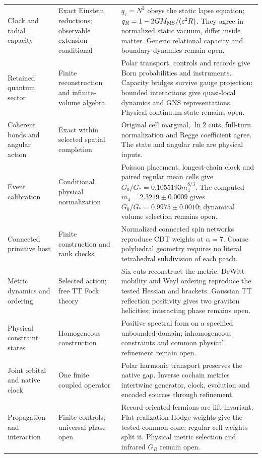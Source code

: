 \documentclass[11pt]{article}
\begin{document}
\begin{longtable}{L{0.24\textwidth}L{0.22\textwidth}L{0.47\textwidth}}
Clock and radial capacity & Exact Einstein reductions; observable extension conditional & $q_\tau=N^2$ obeys the static lapse equation; $q_R=1-2GM_{\rm MS}/(c^2R)$. They agree in normalized static vacuum, differ inside matter. Generic relational capacity and boundary dynamics remain open.\\
Retained quantum sector & Finite reconstruction and infinite-volume algebra & Polar transport, controls and records give Born probabilities and instruments. Capacity bridges survive gauge projection; bounded interactions give quasi-local dynamics and GNS representations. Physical continuum state remains open.\\
Coherent bonds and angular action & Exact within selected spatial completion & Original cell marginal, $\ln2$ cuts, full-turn normalization and Regge coefficient agree. The state and angular rule are physical inputs.\\
Event calibration & Conditional physical normalization & Poisson placement, longest-chain clock and paired regular mean cells give $G_0/G_*=0.1055193m_4^{8/3}$. The computed $m_4=2.3219\pm0.0009$ gives $G_0/G_*=0.9975\pm0.0010$; dynamical volume selection remains open.\\
Connected primitive host & Finite construction and rank checks & Normalized connected spin networks reproduce CDT weights at $\alpha=7$. Coarse polyhedral geometry requires no literal tetrahedral subdivision of each patch.\\
Metric dynamics and ordering & Selected action; free TT Fock theory & Six cuts reconstruct the metric; DeWitt mobility and Weyl ordering reproduce the tested Hessian and brackets. Gaussian TT reflection positivity gives two graviton helicities; interacting phase remains open.\\
Physical constraint states & Homogeneous construction & Positive spectral form on a specified unbounded domain; inhomogeneous constraints and common physical refinement remain open.\\
Joint orbital and native clock & One finite coupled operator & Polar harmonic transport preserves the native gap. Inverse cochain metrics intertwine generator, clock, evolution and encoded sources through refinement.\\
Propagation and interaction & Finite controls; universal phase open & Record-oriented fermions are lift-invariant. Flat-realization Hodge weights give the tested common cone; regular-cell weights split it. Physical metric selection and infrared $G_R$ remain open.\\

\end{longtable}
\end{document}
